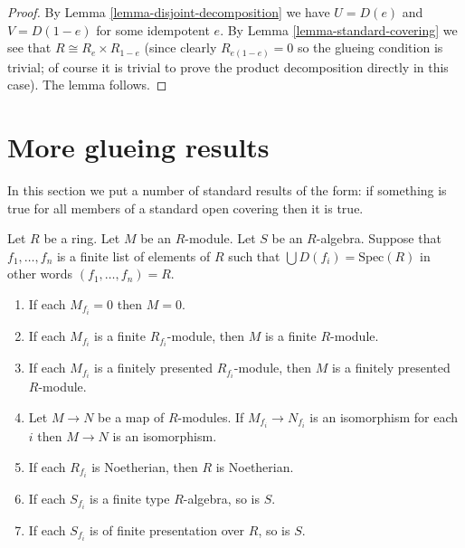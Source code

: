 \begin{proof}
By Lemma \ref{lemma-disjoint-decomposition} we have
$U = D(e)$ and $V = D(1-e)$ for some idempotent $e$.
By Lemma \ref{lemma-standard-covering} we see that
$R \cong R_e \times R_{1 - e}$ (since clearly $R_{e(1-e)} = 0$
so the glueing condition is trivial; of course it is
trivial to prove the product decomposition directly in this
case). The lemma follows.
\end{proof}


















\section{More glueing results}
\label{section-more-glueing}

\noindent
In this section we put a number of standard results of the
form: if something is true for all members of a standard open
covering then it is true.

\begin{lemma}
\label{lemma-cover}
Let $R$ be a ring. Let $M$ be an $R$-module. Let $S$ be an $R$-algebra.
Suppose that $f_1, \ldots, f_n$ is a finite list of
elements of $R$ such that $\bigcup D(f_i) = \text{Spec}(R)$
in other words $(f_1, \ldots, f_n) = R$.
\begin{enumerate}
\item If each $M_{f_i} = 0$ then $M = 0$.
\item If each $M_{f_i}$ is a finite $R_{f_i}$-module,
then $M$ is a finite $R$-module.
\item If each $M_{f_i}$ is a finitely presented $R_{f_i}$-module,
then $M$ is a finitely presented $R$-module.
\item Let $M \to N$ be a map of $R$-modules. If $M_{f_i} \to N_{f_i}$
is an isomorphism for each $i$ then $M \to N$ is an isomorphism.
\item If each $R_{f_i}$ is Noetherian, then $R$ is Noetherian.
\item If each $S_{f_i}$ is a finite type $R$-algebra, so is $S$.
\item If each $S_{f_i}$ is of finite presentation over $R$, so is $S$.
\end{enumerate}
\end{lemma}

